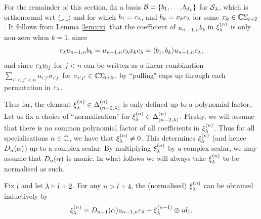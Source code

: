 \mdef\label{pa:spechbas} For the remainder of this section, fix a basis $\mathcal{B}=\{b_1,\dots, b_{d_\lambda}\}$ for $\mathcal{S}_\lambda$, which is orthonormal wrt $\langle \_,\_ \rangle$ and for which $b_1=c_\lambda$, and $b_k=x_k c_\lambda$ for some $x_k\in \mathbb{C} \Sigma_{l+2}$. It follows from Lemma \ref{lem:cxi} that the coefficient of $u_{n-1,n}b_k$ in $\xi^{(n)}_{\lambda}$ is only non-zero when $k=1$, since 
\[ c_\lambda u_{n-1,n}b_k  =u_{n-1,n}c_\lambda x_k c_\lambda =\langle b_1, b_k \rangle u_{n-1,n}  c_\lambda,\]
and since $c_\lambda u_{ij}$ for $j<n$ can be written as a linear combination $\sum_{i'<j'<n} u_{i'j'} \sigma_{i'j'}$ for $\sigma_{i'j'}\in \mathbb{C}\Sigma_{l+2}$, by ``pulling" cups up through each permutation in $c_\lambda$.

\mdef \label{de:xinorm} Thus far, the element $\xi^{(n)}_\lambda\in \Delta^{(n)}_{(n-2,\lambda)}$ is only defined up to a polynomial factor. Let us fix a choice of ``normalisation" for $\xi^{(n)}_\lambda\in \Delta^{(n)}_{(n-2,\lambda)}$. Firstly, we will assume that there is no common polynomial factor of all coefficients in $\xi^{(n)}_\lambda$. Thus for all specialisations $\alpha\in \mathbb{C}$, we have that $\xi^{(n)}_\lambda\neq 0$. This determines $\xi^{(n)}_\lambda$ (and hence $D_n(\alpha)$) up to a complex scalar. By multiplying $\xi^{(n)}_\lambda$ by a complex scalar, we may assume that $D_n(\alpha)$ is monic. In what follows we will always take $\xi^{(n)}_\lambda$ to be normalised as such. 


\begin{lemma} Fix $l$ and let $\lambda\vdash l+2$. For any $n > l+4$, the (normalised) $\xi^{(n)}_\lambda$ can be obtained inductively by
\begin{equation} \label{eq:ind2} \xi^{(n)}_\lambda = D_{n-1}(\alpha) {\mathsf u}_{n-1,n}c_{\lambda}-\xi_{\lambda}^{(n-1)}\otimes id_1. \end{equation}
\end{lemma}

